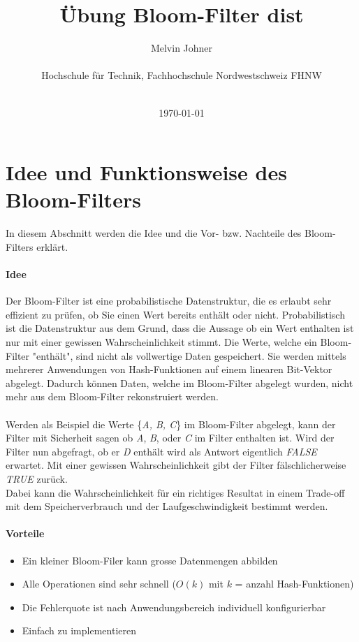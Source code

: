 \documentclass[12pt]{article}
\title{Übung Bloom-Filter dist}
\author
{Melvin Johner\\
\\
\normalsize{Hochschule für Technik, Fachhochschule Nordwestschweiz FHNW}\\
\\
}
\date{\today}
\begin{document}
 


\baselineskip24pt


\maketitle
\section*{Idee und Funktionsweise des Bloom-Filters}
In diesem Abschnitt werden die Idee und die Vor- bzw.
Nachteile des Bloom-Filters erklärt.
\paragraph*{Idee}
Der Bloom-Filter ist eine probabilistische Datenstruktur,
die es erlaubt sehr effizient zu prüfen,
ob Sie einen Wert bereits enthält oder nicht.
Probabilistisch ist die Datenstruktur aus dem Grund,
dass die Aussage ob ein Wert enthalten ist nur mit einer gewissen Wahrscheinlichkeit stimmt.
Die Werte, welche ein Bloom-Filter "enthält", sind nicht als vollwertige Daten gespeichert.
Sie werden mittels mehrerer Anwendungen von Hash-Funktionen auf einem linearen Bit-Vektor abgelegt.
Dadurch können Daten, welche im Bloom-Filter abgelegt wurden,
nicht mehr aus dem Bloom-Filter rekonstruiert werden.
\\
\\
Werden als Beispiel die Werte \{{\it A, B, C}\} im Bloom-Filter abgelegt,
kann der Filter mit Sicherheit sagen ob {\it A}, {\it B}, oder {\it C} im Filter enthalten ist.
Wird der Filter nun abgefragt, ob er {\it D} enthält wird als Antwort eigentlich {\it FALSE} erwartet.
Mit einer gewissen Wahrscheinlichkeit gibt der Filter fälschlicherweise {\it TRUE} zurück.
\\
Dabei kann die Wahrscheinlichkeit für ein richtiges Resultat in einem
Trade-off mit dem Speicherverbrauch und der Laufgeschwindigkeit bestimmt werden.

\paragraph*{Vorteile}
\begin{itemize}
\item Ein kleiner Bloom-Filer kann grosse Datenmengen abbilden
\item Alle Operationen sind sehr schnell ($O(k)$ mit $k$ = anzahl Hash-Funktionen)
\item Die Fehlerquote ist nach Anwendungsbereich individuell konfigurierbar
\item Einfach zu implementieren
\end{itemize}
\end{document}
